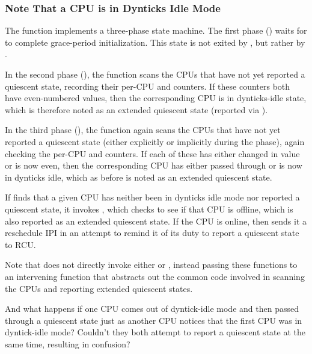 \subsubsection{Note That a CPU is in Dynticks Idle Mode}
\label{app:rcuimpl:rcutree:Note That a CPU is in Dynticks Idle Mode}

The  function implements a
three-phase state machine.
The first phase () waits for 
to complete grace-period initialization.
This state is not exited by , but rather
by .

In the second phase (), the
 function scans the CPUs that
have not yet reported a quiescent state, recording their per-CPU
 and  counters.
If these counters both have even-numbered values, then the corresponding
CPU is in dynticks-idle state, which is therefore noted as an extended
quiescent state (reported via ).

In the third phase (), the
 function again scans the CPUs
that have not yet reported a quiescent state (either explicitly or
implicitly during the  phase), again checking the
per-CPU  and  counters.
If each of these has either changed in value or is now even, then
the corresponding CPU has either passed through or is now in dynticks
idle, which as before is noted as an extended quiescent state.

If  finds that a given CPU
has neither been in dynticks idle mode nor reported a quiescent state,
it invokes , which checks to see
if that CPU is offline, which is also reported as an extended quiescent
state.
If the CPU is online, then  sends
it a reschedule IPI in an attempt to remind it of its duty to report
a quiescent state to RCU.

Note that  does not directly
invoke either  or
, instead passing these functions
to an intervening  function that
abstracts out the common code involved in scanning the CPUs and reporting
extended quiescent states.

\QuickQuiz{}
	And what happens if one CPU comes out of dyntick-idle mode and then
	passed through a quiescent state just as another CPU notices that the
	first CPU was in dyntick-idle mode?
	Couldn't they both attempt to report a quiescent state at the same
	time, resulting in confusion?
 \QuickQuizEnd

